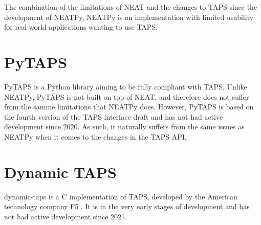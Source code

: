 The combination of the limitations of NEAT and the changes to TAPS
since the development of NEATPy, NEATPy is an implementation with
limited usability for real-world applications wanting to use TAPS.

\section{PyTAPS}
PyTAPS \cite{frankePythonasynciotaps2025} is a Python library aiming
to be fully compliant with TAPS. Unlike NEATPy, PyTAPS is not built
on top of NEAT, and therefore does not suffer from the samme limitations
that NEATPy does. However, PyTAPS is based on the fourth version of the TAPS
interface draft \cite{frankePythonasynciotaps2025} and has not had active
development since 2020. As such, it naturally suffers from the same
issues as NEATPy when it comes to the changes in the TAPS API.

\section{Dynamic TAPS}
dynamic-taps is a C implementation of TAPS, developed by the
American technology company F5 \cite{dukeDynamictaps2025}. It
is in the very early stages of development and has not had
active development since 2021.


